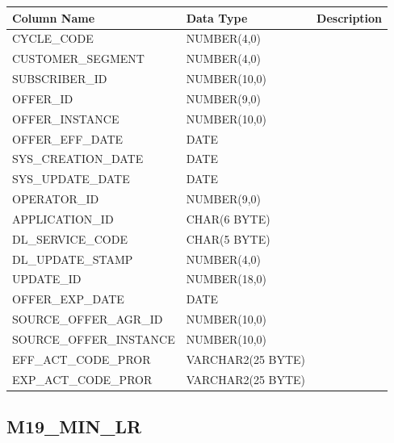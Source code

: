\documentclass[12pt,twoside]{article}
\begin{document}
\begin{center}
\begin{tabular}{lll}
\hline
 \textbf{Column Name}     &  \textbf{Data Type}  &  \textbf{Description}  \\
\hline
 CYCLE\_CODE              &  NUMBER(4,0)         &                        \\
 CUSTOMER\_SEGMENT        &  NUMBER(4,0)         &                        \\
 SUBSCRIBER\_ID           &  NUMBER(10,0)        &                        \\
 OFFER\_ID                &  NUMBER(9,0)         &                        \\
 OFFER\_INSTANCE          &  NUMBER(10,0)        &                        \\
 OFFER\_EFF\_DATE         &  DATE                &                        \\
 SYS\_CREATION\_DATE      &  DATE                &                        \\
 SYS\_UPDATE\_DATE        &  DATE                &                        \\
 OPERATOR\_ID             &  NUMBER(9,0)         &                        \\
 APPLICATION\_ID          &  CHAR(6 BYTE)        &                        \\
 DL\_SERVICE\_CODE        &  CHAR(5 BYTE)        &                        \\
 DL\_UPDATE\_STAMP        &  NUMBER(4,0)         &                        \\
 UPDATE\_ID               &  NUMBER(18,0)        &                        \\
 OFFER\_EXP\_DATE         &  DATE                &                        \\
 SOURCE\_OFFER\_AGR\_ID   &  NUMBER(10,0)        &                        \\
 SOURCE\_OFFER\_INSTANCE  &  NUMBER(10,0)        &                        \\
 EFF\_ACT\_CODE\_PROR     &  VARCHAR2(25 BYTE)   &                        \\
 EXP\_ACT\_CODE\_PROR     &  VARCHAR2(25 BYTE)   &                        \\
\hline
\end{tabular}
\end{center}


\normalsize
\subsection{M19\_MIN\_LR}
\label{sec-9-6}
\end{document}
